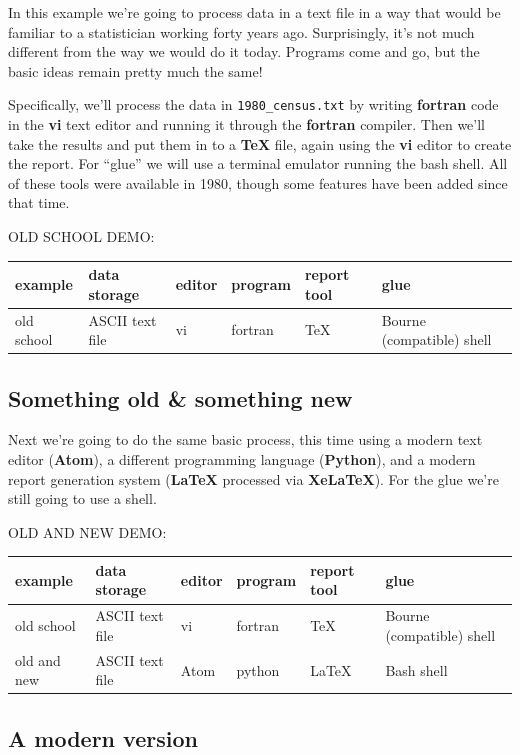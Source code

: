 \documentclass[
]{book}
\begin{document}
In this example we're going to process data in a text file in a way that would be familiar to a statistician working forty years ago. Surprisingly, it's not much different from the way we would do it today. Programs come and go, but the basic ideas remain pretty much the same!

Specifically, we'll process the data in \texttt{1980\_census.txt} by writing \textbf{fortran} code in the \textbf{vi} text editor and running it through the \textbf{fortran} compiler. Then we'll take the results and put them in to a \textbf{TeX} file, again using the \textbf{vi} editor to create the report. For ``glue'' we will use a terminal emulator running the bash shell. All of these tools were available in 1980, though some features have been added since that time.

OLD SCHOOL DEMO:

\begin{longtable}[]{@{}llllll@{}}
\toprule
example & data storage & editor & program & report tool & glue\tabularnewline
\midrule
\endhead
old school & ASCII text file & vi & fortran & TeX & Bourne (compatible) shell\tabularnewline
\bottomrule
\end{longtable}

\hypertarget{something-old-something-new}{%
\subsection{Something old \& something new}\label{something-old-something-new}}

Next we're going to do the same basic process, this time using a modern text editor (\textbf{Atom}), a different programming language (\textbf{Python}), and a modern report generation system (\textbf{LaTeX} processed via \textbf{XeLaTeX}). For the glue we're still going to use a shell.

OLD AND NEW DEMO:

\begin{longtable}[]{@{}llllll@{}}
\toprule
example & data storage & editor & program & report tool & glue\tabularnewline
\midrule
\endhead
old school & ASCII text file & vi & fortran & TeX & Bourne (compatible) shell\tabularnewline
old and new & ASCII text file & Atom & python & LaTeX & Bash shell\tabularnewline
\bottomrule
\end{longtable}

\hypertarget{a-modern-version}{%
\subsection{A modern version}\label{a-modern-version}}
\end{document}
